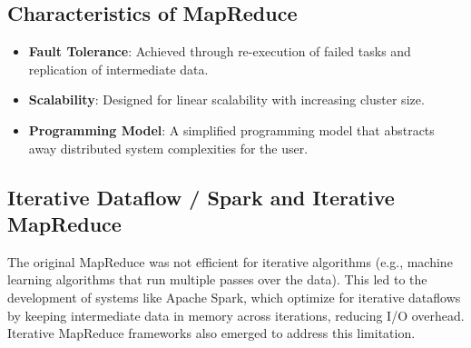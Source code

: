 \documentclass{article}
\begin{document}
\subsection*{Characteristics of MapReduce}
\begin{itemize}
    \item \textbf{Fault Tolerance}: Achieved through re-execution of failed tasks and replication of intermediate data.
    \item \textbf{Scalability}: Designed for linear scalability with increasing cluster size.
    \item \textbf{Programming Model}: A simplified programming model that abstracts away distributed system complexities for the user.
\end{itemize}

\subsection*{Iterative Dataflow / Spark and Iterative MapReduce}
The original MapReduce was not efficient for iterative algorithms (e.g., machine learning algorithms that run multiple passes over the data). This led to the development of systems like Apache Spark, which optimize for iterative dataflows by keeping intermediate data in memory across iterations, reducing I/O overhead. Iterative MapReduce frameworks also emerged to address this limitation.
\end{document}

